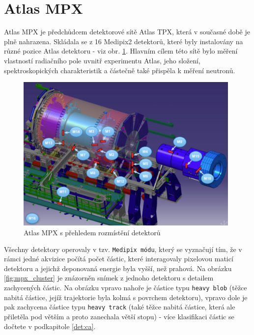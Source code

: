 \section{Atlas MPX}\label{atlas:mpx}
Atlas MPX\cite{Vykydal200935}\cite{atlasmpx} je předchůdcem detektorové sítě Atlas TPX, která v současné době je plně nahrazena. Skládala se z 16 Medipix2 detektorů, které byly instalovány na různé pozice Atlas detektoru - viz obr. \ref{fig:mpx_positions}. Hlavním cílem této sítě bylo měření vlastností radiačního pole uvnitř experimentu Atlas, jeho složení, spektroskopických charakteristik a částečně také přispěla k měření neutronů. 

\begin{figure}[ht]
	\begin{center}
		\includegraphics[width=11cm]{figures/mpx_positions.png}
		\caption{Atlas MPX s přehledem rozmístění detektorů}
		\label{fig:mpx_positions}
	\end{center}
\end{figure}

Všechny detektory operovaly v tzv. \texttt{Medipix módu}, který se vyznačují tím, že v rámci jedné akvizice počítá počet částic, které interagovaly pixelovou maticí detektoru a jejichž deponovaná energie byla vyšší, než prahová. Na obrázku \ref{fig:mpx_cluster} je znázorněn snímek z jednoho detektoru s detailem zachycených částic. Na obrázku vpravo nahoře je částice typu \texttt{heavy blob} (těžce nabitá částice, jejíž trajektorie byla kolmá s povrchem detektoru), vpravo dole je pak zachycena částice typu \texttt{heavy track} (také těžce nabitá částice, která ale přiletěla pod větším a proto zanechala větší stopu) - více klasifikaci částic se dočtete v podkapitole \ref{det:ca}.


